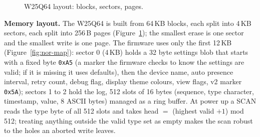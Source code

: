 \documentclass[a4paper,10pt]{article}
\begin{document}
\begin{figure}[H]
\centering
{}
\caption{W25Q64 layout: blocks, sectors, pages.}
\label{fig:nor-chip}
\end{figure}

\textbf{Memory layout.} The W25Q64 is built from 64\,KB blocks, each split into 4\,KB
sectors, each split into 256\,B pages (Figure~\ref{fig:nor-chip}); the smallest erase is one
sector and the smallest write is one page. The firmware uses only the first 12\,KB
(Figure~\ref{fig:nor-map}): sector 0 (4\,KB) holds a 32 byte settings
blob that starts with a fixed byte \texttt{0xA5} (a marker the firmware checks to know the
settings are valid; if it is missing it uses defaults), then the device name, auto presence
interval, retry count, debug
flag, display theme colours, view flags, v2 marker \texttt{0x5A}); sectors 1 to 2 hold the
log, 512 slots of 16 bytes (sequence, type character, timestamp, value, 8 ASCII
bytes) managed as a ring buffer. At power up a SCAN reads the type byte of all 512
slots and takes head $=$ (highest valid $+1$) mod 512; treating anything outside the
valid type set as empty makes the scan robust to the holes an aborted write leaves.
\end{document}
